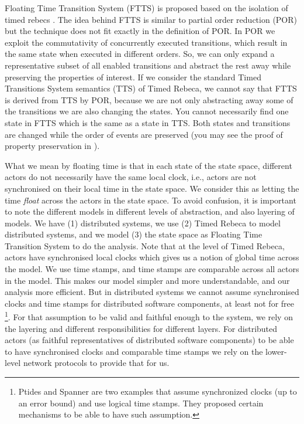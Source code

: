 \begin{figure}[!htbp]
\begin{center}
{ 		}
 		\label{fig::TRebecaSyntax}
 	\end{center}
 \end{figure}


Floating Time Transition System (FTTS) is proposed based on the isolation of timed rebecs \cite{DBLP:conf/facs2/KhamespanahSVK15,DBLP:journals/scp/KhamespanahSSKI15}. The idea behind FTTS is similar to partial order reduction (POR) but the technique does not fit exactly in the definition of POR. 
%
In POR we exploit the commutativity of concurrently executed transitions, which result in the same state when executed in different orders. So, we can only expand a representative subset of all enabled transitions and abstract the rest away while preserving the properties of interest. %
%
If we consider the standard Timed Transitions System semantics (TTS) of Timed Rebeca, we cannot say that FTTS is derived from TTS by POR, because we are not only abstracting away some of the transitions we are also changing the states. You cannot necessarily find one state in FTTS which is the same as a state in TTS. Both states and transitions are changed while the order of events are preserved (you may see the proof of property preservation in \cite{DBLP:conf/facs2/KhamespanahSVK15}).
%

What we mean by floating time is that in each state of the state space, different actors do not necessarily have the same local clock, i.e.,  actors are not synchronised on their local time in the state space. We consider this as letting the time \textit{float} across the actors in the state space. 
To avoid confusion, it is important to note the different models in different levels of abstraction, and also layering of models. We have (1) distributed systems, we use (2) Timed Rebeca to model distributed systems, and we model (3) the state space as Floating Time Transition System to do the analysis. 
%
Note that at the level of Timed Rebeca, actors have synchronised local clocks which gives us a notion of global time across the model. We use time stamps, and time stamps are comparable across all actors in the model. This makes our model simpler and more understandable, and our analysis more efficient.
But in distributed systems we cannot assume synchronised clocks and time stamps for distributed software components, at least not for free \footnote{Ptides\cite{DBLP:conf/dsrt/DerlerLM08} and Spanner\cite{} are two examples that assume synchronized clocks  (up to an error bound) and use logical time stamps.
They proposed certain mechanisms to be able to have such assumption.}. 
For that assumption to be valid and faithful enough to the system,  we rely on the layering and different responsibilities for different layers. For distributed actors (as faithful representatives of distributed software components) to be able to have synchronised clocks and comparable time stamps we rely on the lower-level network protocols to provide that for us. 

